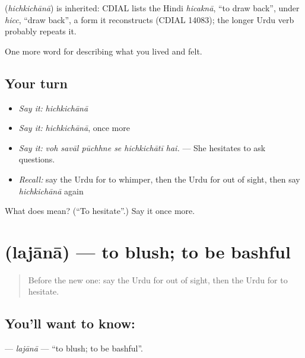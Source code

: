 \begin{cousinweb}
\textbf{} (\emph{hichkichānā}) is inherited: CDIAL lists the Hindi \emph{hicaknā}, \textquotedblleft{}to draw back\textquotedblright{}, under \emph{hicc}, \textquotedblleft{}draw back\textquotedblright{}, a form it reconstructs (CDIAL 14083); the longer Urdu verb probably repeats it.
\end{cousinweb}

\begin{grammarlens}[title={What you've built}]
One more word for describing what you lived and felt.
\end{grammarlens}

\subsection*{Your turn}
\begin{itemize}
\raggedright
  \item \emph{Say it:} \emph{hichkichānā}
  \item \emph{Say it:} \emph{hichkichānā}, once more
  \item \emph{Say it:} \emph{voh savāl pūchhne se hichkichātī hai.} — She hesitates to ask questions.
  \item \emph{Recall:} say the Urdu for to whimper, then the Urdu for out of sight, then say \emph{hichkichānā} again
\end{itemize}

\begin{tcolorbox}[breakable,colback=teal!4,colframe=teal!35!black,title={Before you move on}]
What does  mean? (\textquotedblleft{}To hesitate\textquotedblright{}.) Say it once more.
\end{tcolorbox}
\section[\texorpdfstring{\ur{لجانا} (lajānā)}{لجانا (lajānā)}]{ (lajānā) — to blush; to be bashful}

\label{lesson:UR-C451-lajana}



\begin{quote}
Before the new one: say the Urdu for out of sight, then the Urdu for to hesitate.
\end{quote}

\subsection*{You'll want to know: }
\textbf{} — \emph{lajānā} — \textquotedblleft{}to blush; to be bashful\textquotedblright{}.

